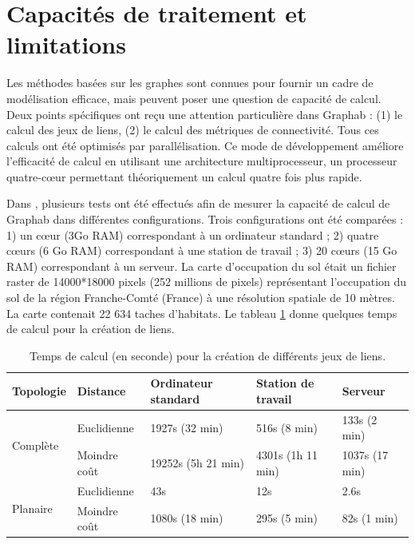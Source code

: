 \documentclass{article}
\begin{document}
\section{Capacités de traitement et limitations}
\label{limit}
Les méthodes basées sur les graphes sont connues pour fournir un cadre de modélisation efficace, mais peuvent poser une question de capacité de calcul. Deux points spécifiques ont reçu une attention particulière dans Graphab : (1) le calcul des jeux de liens, (2) le calcul des métriques de connectivité. Tous ces calculs ont été optimisés par parallélisation. Ce mode de développement améliore l'efficacité de calcul en utilisant une architecture multiprocesseur, un processeur quatre-cœur permettant théoriquement un calcul quatre fois plus rapide. 

Dans \cite{2012_graphab_EMS}, plusieurs tests ont été effectués afin de mesurer la capacité de calcul de Graphab dans différentes configurations. Trois configurations ont été comparées : 1) un cœur (3Go RAM) correspondant à un ordinateur standard ; 2) quatre cœurs (6 Go RAM) correspondant à une station de travail ; 3)  20 cœurs (15 Go RAM) correspondant à un serveur. La carte d’occupation du sol était un fichier raster de 14000*18000 pixels (252 millions de pixels) représentant l’occupation du sol de la région Franche-Comté (France) à une résolution spatiale de 10 mètres. La carte contenait 22 634 taches d’habitats. Le tableau \ref{perf} donne quelques temps de calcul pour la création de liens.

\begin{table}[H]
\begin{tabular}{|m{3.049cm}|m{3.049cm}|m{3.494cm}|m{3.0509999cm}|m{2.603cm}|}
\hline
Topologie & Distance & Ordinateur standard & Station de travail & Serveur\\
\hline
\multirow{2}{*}{Complète}
 & Euclidienne & 1927s (32 min) & 516s (8 min) & 133s (2 min)\\
\hhline{~----}
 & Moindre coût & 19252s (5h 21 min) & 4301s (1h 11 min) & 1037s (17 min)\\
\hline
\multirow{2}{*}{Planaire}
 & Euclidienne & 43s & 12s & 2.6s\\
\hhline{~----}
 & Moindre coût & 1080s (18 min) & 295s (5 min) & 82s (1 min)\\
\hline
\end{tabular}
\caption{Temps de calcul (en seconde) pour la création de différents jeux de liens.}
\label{perf}
\end{table}
\end{document}
